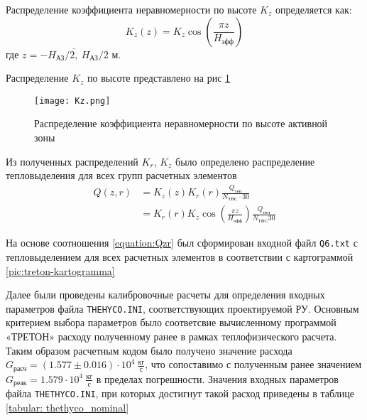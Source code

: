 \noindent Распределение коэффициента неравномерности по высоте $K_z$ определяется как:
\begin{equation}
    K_z(z) = K_z \cos \left( \frac {\pi z} {H_{\text{эфф}}} \right)
\end{equation}
где $z = \overline{-H_{\text{АЗ}} / 2,\  H_{\text{АЗ}} / 2}$ м.


\noindent Распределение $K_z$ по высоте представлено на рис \ref{pic:Kz}


\begin{figure}[H]
	\begin{center}
		\texttt{[image: Kz.png]}
		\caption{Распределение коэффициента неравномерности по высоте активной зоны}
		\label{pic:Kz}
	\end{center}
\end{figure}

Из полученных распределений $K_r$, $K_z$ было определено распределение тепловыделения для всех групп расчетных элементов
\begin{align}
    \label{equation:Qzr}
    Q(z, r) &= K_z(z)K_r(r)\frac{Q_{\text{теп}}}{N_{\text{ТВС}} \cdot 30} \\
            &= K_r(r) K_z \cos \left( \frac{\pi z}{H_{\text{эфф}}} \right) \frac{Q_{\text{теп}}}{N_{\text{ТВС}} 30}
\end{align}

На основе соотношения \ref{equation:Qzr} был сформирован входной файл \texttt{Q6.txt} с тепловыделением для всех расчетных элементов в соответствии с картограммой \ref{pic:treton-kartogramma}

Далее были проведены калибровочные расчеты для определения входных параметров файла \texttt{THEHYCO.INI}, соответствующих проектируемой РУ. Основным критерием выбора параметров было соответсвие вычисленному программой «ТРЕТОН» расходу полученному ранее в рамках теплофизического расчета. Таким образом расчетным кодом было получено значение расхода $G_{\text{расч}} = (1.577 \pm 0.016) \cdot 10^4\  \frac{\text{кг}}{\text{с}}$, что сопоставимо с полученным ранее значением $G_{\text{реак}} = 1.579 \cdot 10^4\ \frac{\text{кг}}{\text{с}}$ в пределах погрешности. Значения входных параметров файла \texttt{THETHYCO.INI}, при которых достигнут такой расход приведены в таблице \ref{tabular: thethyco_nominal} %



